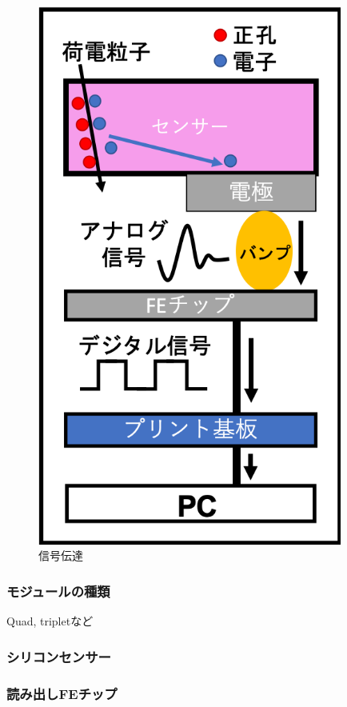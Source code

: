 \begin{figure}[bpt]\centering
\includegraphics[width=10cm]{module_electric_overview}
\caption[信号伝達]{信号伝達}
\label{module_electric_overview}
\end{figure}

\subsubsection{モジュールの種類}
Quad, tripletなど

\subsubsection{シリコンセンサー}

\subsubsection{読み出しFEチップ}

